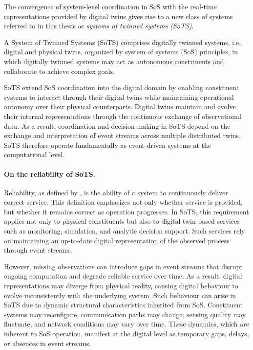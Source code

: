The convergence of system-level coordination in SoS with the real-time representations provided by digital twins gives rise to a new class of systems referred to in this thesis as \emph{systems of twinned systems (SoTS)}.

\begin{definitionframe}
A System of Twinned Systems (SoTS) comprises digitally twinned systems, i.e., digital and physical twins, organized by system of systems (SoS) principles, in which digitally twinned systems may act as autonomous constituents and collaborate to achieve complex goals.
\end{definitionframe}

SoTS extend SoS coordination into the digital domain by enabling constituent systems to interact through their digital twins while maintaining operational autonomy over their physical counterparts. Digital twins maintain and evolve their internal representations through the continuous exchange of observational data. As a result, coordination and decision-making in SoTS depend on the exchange and interpretation of event streams across multiple distributed twins. SoTS therefore operate fundamentally as event-driven systems at the computational level.

\paragraph{On the reliability of SoTS.}
Reliability, as defined by \citet{avizienis2004basic}, is the ability of a system to continuously deliver correct service. This definition emphasizes not only whether service is provided, but whether it remains correct as operation progresses. In SoTS, this requirement applies not only to physical constituents but also to digital-twin-based services such as monitoring, simulation, and analytic decision support. Such services rely on maintaining an up-to-date digital representation of the observed process through event streams. 

However, missing observations can introduce gaps in event streams that disrupt ongoing computation and degrade reliable service over time. As a result, digital representations may diverge from physical reality, causing digital behaviour to evolve inconsistently with the underlying system. Such behaviour can arise in SoTS due to dynamic structural characteristics inherited from SoS. Constituent systems may reconfigure, communication paths may change, sensing quality may fluctuate, and network conditions may vary over time. These dynamics, which are inherent to SoS operation, manifest at the digital level as temporary gaps, delays, or absences in event streams.

